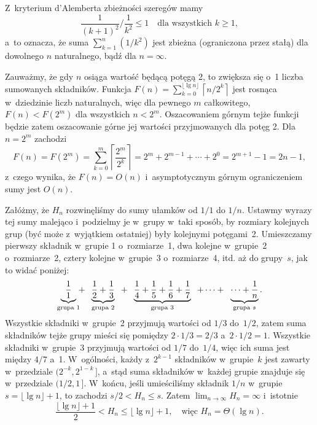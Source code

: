 
\exercise{} %
\noindent Z~kryterium d'Alemberta zbieżności szeregów mamy
\[
	\frac{1}{(k+1)^2}\bigg/\frac{1}{k^2} \le 1 \quad\text{dla wszystkich $k\ge1$},
\]
a~to oznacza, że suma $\sum_{k=1}^n(1/k^2)$ jest zbieżna (ograniczona przez stałą) dla dowolnego $n$ naturalnego, bądź dla $n=\infty$.

\exercise{} %
\noindent Zauważmy, że gdy $n$ osiąga wartość będącą potęgą 2, to zwiększa się o~1 liczba sumowanych składników. Funkcja $F(n)=\sum_{k=0}^{\lfloor\lg n\rfloor}\left\lceil n/2^k\right\rceil$ jest rosnąca w~dziedzinie liczb naturalnych, więc dla pewnego $m$ całkowitego, $F(n)<F(2^m)$ dla wszystkich $n<2^m$. Oszacowaniem górnym tejże funkcji będzie zatem oszacowanie górne jej wartości przyjmowanych dla potęg 2. Dla $n=2^m$ zachodzi
\[
	F(n) = F(2^m) = \sum_{k=0}^m\left\lceil\frac{2^m}{2^k}\right\rceil = 2^m+2^{m-1}+\cdots+2^0 = 2^{m+1}-1 = 2n-1,
\]
z~czego wynika, że $F(n)=O(n)$ i~asymptotycznym górnym ograniczeniem sumy jest $O(n)$.

\exercise{} %
\noindent Załóżmy, że $H_n$ rozwinęliśmy do sumy ułamków od $1/1$ do $1/n$. Ustawmy wyrazy tej sumy malejąco i~podzielmy je w~grupy w~taki sposób, by rozmiary kolejnych grup (być może z~wyjątkiem ostatniej) były kolejnymi potęgami~2. Umieszczamy pierwszy składnik w~grupie 1 o~rozmiarze~1, dwa kolejne w~grupie~2 o~rozmiarze~2, cztery kolejne w~grupie~3 o~rozmiarze~4, itd. aż do grupy~$s$, jak to widać poniżej:
\[
	\underbrace{\frac{1}{1}}_{\text{\scriptsize grupa 1}}\!\!+\;\;\underbrace{\frac{1}{2}+\frac{1}{3}}_{\text{\scriptsize grupa 2}}\;\;+\;\;\underbrace{\frac{1}{4}+\frac{1}{5}+\frac{1}{6}+\frac{1}{7}}_{\text{\scriptsize grupa 3}}\;\;+\cdots+\;\;\underbrace{\cdots +\frac{1}{n}}_{\text{\scriptsize grupa $s$}}.
\]
Wszystkie składniki w~grupie~2 przyjmują wartości od $1/3$ do~$1/2$, zatem suma składników tejże grupy mieści się pomiędzy $2\cdot1/3=2/3$ a~$2\cdot1/2=1$. Wszystkie składniki w~grupie~3 przyjmują wartości od $1/7$ do~$1/4$, więc ich suma jest między $4/7$ a~1. W~ogólności, każdy z~$2^{k-1}$ składników w~grupie~$k$ jest zawarty w~przedziale $\bigl(2^{-k},2^{1-k}\,\bigr]$, a~stąd suma składników w~każdej grupie znajduje się w~przedziale $(1/2,1\,]$. W~końcu, jeśli umieściliśmy składnik $1/n$ w~grupie $s = \lfloor\lg n\rfloor+1$, to zachodzi $s/2<H_n\le s$. Zatem $\lim_{n\to\infty}H_n=\infty$ i~istotnie
\[
	\frac{\lfloor\lg n\rfloor+1}{2} < H_n \le \lfloor\lg n\rfloor+1, \quad\text{więc $H_n=\Theta(\lg n)$}.
\]

